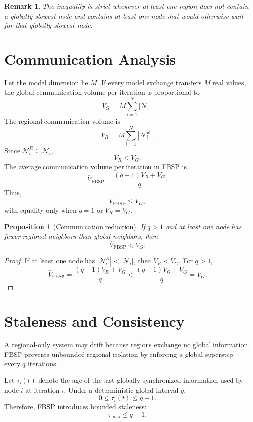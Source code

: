 ﻿\documentclass[10pt,journal]{IEEEtran}
\newtheorem{proposition}{Proposition}
\newtheorem{remark}{Remark}
\begin{document}
	\begin{remark}
		The inequality is strict whenever at least one region does not contain a globally slowest node and contains at least one node that would otherwise wait for that globally slowest node.
	\end{remark}
	
	\section{Communication Analysis}
	
	Let the model dimension be $M$. If every model exchange transfers $M$ real values, the global communication volume per iteration is proportional to
	\[
	V_G
	=
	M\sum_{i=1}^{N}|\mathcal{N}_i|.
	\]
	The regional communication volume is
	\[
	V_R
	=
	M\sum_{i=1}^{N}|\mathcal{N}_i^R|.
	\]
	Since $\mathcal{N}_i^R\subseteq\mathcal{N}_i$,
	\[
	V_R \leq V_G.
	\]
	The average communication volume per iteration in FBSP is
	\[
	\bar{V}_{\mathrm{FBSP}}
	=
	\frac{(q-1)V_R+V_G}{q}.
	\]
	Thus,
	\[
	\bar{V}_{\mathrm{FBSP}}
	\leq
	V_G,
	\]
	with equality only when $q=1$ or $V_R=V_G$.
	
	\begin{proposition}[Communication reduction]
		If $q>1$ and at least one node has fewer regional neighbors than global neighbors, then
		\[
		\bar{V}_{\mathrm{FBSP}} < V_G.
		\]
	\end{proposition}
	
	\begin{proof}
		If at least one node has $|\mathcal{N}_i^R|<|\mathcal{N}_i|$, then $V_R<V_G$. For $q>1$,
		\[
		\bar{V}_{\mathrm{FBSP}}
		=
		\frac{(q-1)V_R+V_G}{q}
		<
		\frac{(q-1)V_G+V_G}{q}
		=
		V_G.
		\]
	\end{proof}
	
	\section{Staleness and Consistency}
	
	A regional-only system may drift because regions exchange no global information. FBSP prevents unbounded regional isolation by enforcing a global superstep every $q$ iterations.
	
	Let $\tau_i(t)$ denote the age of the last globally synchronized information used by node $i$ at iteration $t$. Under a deterministic global interval $q$,
	\[
	0\leq \tau_i(t)\leq q-1.
	\]
	Therefore, FBSP introduces bounded staleness:
	\[
	\tau_{\max}\leq q-1.
	\]
	
\end{document}
